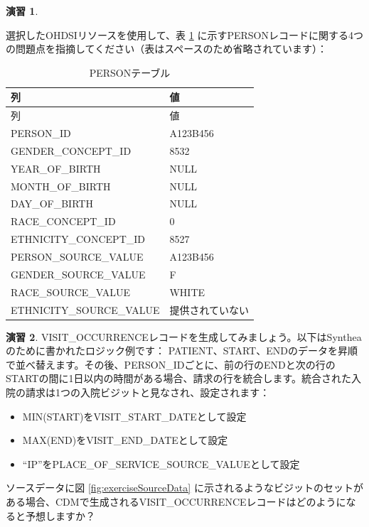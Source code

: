 \documentclass[
  11pt]{book}
\providecommand{\tightlist}{%
  \setlength{\itemsep}{0pt}\setlength{\parskip}{0pt}}
\theoremstyle{definition}
\theoremstyle{definition}
\theoremstyle{definition}
\newtheorem{exercise}{演習}[chapter]
\theoremstyle{definition}
\theoremstyle{remark}
\begin{document}
\begin{exercise}
\protect\hypertarget{exr:exerciseEtl2}{}\label{exr:exerciseEtl2}

選択したOHDSIリソースを使用して、表 \ref{tab:exercisePersonTable} に示すPERSONレコードに関する4つの問題点を指摘してください（表はスペースのため省略されています）：

\begin{longtable}[]{@{}ll@{}}
\caption{\label{tab:exercisePersonTable} PERSONテーブル}\tabularnewline
\toprule\noalign{}
列 & 値 \\
\midrule\noalign{}
\endfirsthead
\toprule\noalign{}
列 & 値 \\
\midrule\noalign{}
\endhead
\bottomrule\noalign{}
\endlastfoot
PERSON\_ID & A123B456 \\
GENDER\_CONCEPT\_ID & 8532 \\
YEAR\_OF\_BIRTH & NULL \\
MONTH\_OF\_BIRTH & NULL \\
DAY\_OF\_BIRTH & NULL \\
RACE\_CONCEPT\_ID & 0 \\
ETHNICITY\_CONCEPT\_ID & 8527 \\
PERSON\_SOURCE\_VALUE & A123B456 \\
GENDER\_SOURCE\_VALUE & F \\
RACE\_SOURCE\_VALUE & WHITE \\
ETHNICITY\_SOURCE\_VALUE & 提供されていない \\
\end{longtable}

\end{exercise}

\begin{exercise}
\protect\hypertarget{exr:exerciseEtl3}{}\label{exr:exerciseEtl3}VISIT\_OCCURRENCEレコードを生成してみましょう。以下はSyntheaのために書かれたロジック例です：
PATIENT、START、ENDのデータを昇順で並べ替えます。その後、PERSON\_IDごとに、前の行のENDと次の行のSTARTの間に1日以内の時間がある場合、請求の行を統合します。統合された入院の請求は1つの入院ビジットと見なされ、設定されます：

\begin{itemize}
\tightlist
\item
  MIN(START)をVISIT\_START\_DATEとして設定
\item
  MAX(END)をVISIT\_END\_DATEとして設定
\item
  ``IP''をPLACE\_OF\_SERVICE\_SOURCE\_VALUEとして設定
\end{itemize}

ソースデータに図 \ref{fig:exerciseSourceData} に示されるようなビジットのセットがある場合、CDMで生成されるVISIT\_OCCURRENCEレコードはどのようになると予想しますか？
\end{exercise}
\end{document}
